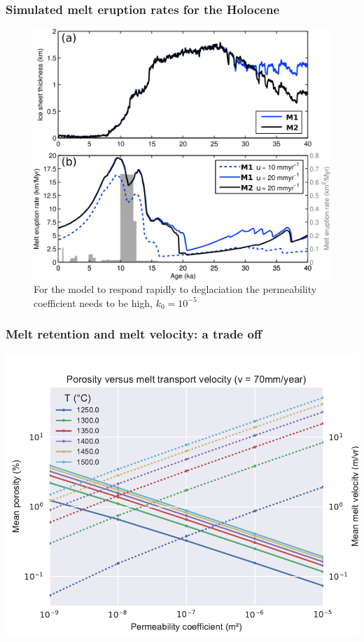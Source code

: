 \documentclass[aspectratio=169]{beamer}
\begin{document}
\begin{frame}
    \frametitle{Simulated melt eruption rates for the Holocene}
    \begin{figure}
        \includegraphics[height=0.7\paperheight]{./figures/iceland-model2.png}
        \caption{For the model to respond rapidly to deglaciation the permeability coefficient needs to be high, $k_{0}=10^{-5}$}
    \end{figure}
\end{frame}


\begin{frame}
    \frametitle{Melt retention and melt velocity: a trade off}
    \centering
    \includegraphics[height=0.7\paperheight]{./figures/ch2-phi-vm.pdf}
\end{frame}
\end{document}
